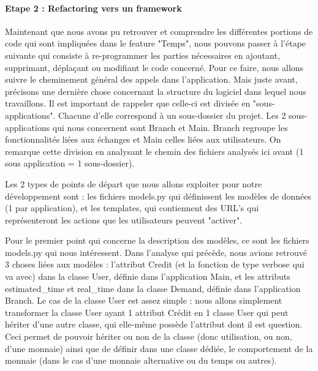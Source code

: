 \paragraph{Etape 2 : Refactoring vers un framework}

Maintenant que nous avons pu retrouver et comprendre les différentes portions de code qui sont impliquées dans le feature "Temps",  nous pouvons passer à l'étape suivante qui consiste à re-programmer les parties nécessaires en ajoutant,  supprimant,  déplaçant ou modifiant le code concerné.  Pour ce faire,  nous allons suivre le cheminement général des appels dans l'application.  Mais juste avant,  précisons une dernière chose concernant la structure du logiciel dans lequel nous travaillons.  Il est important de rappeler que celle-ci est divisée en "sous-applications".  Chacune d'elle correspond à un sous-dossier du projet.  Les 2 sous-applications qui nous concernent sont Branch et Main.  Branch regroupe les fonctionnalités liées aux échanges et Main celles liées aux utilisateurs.  On remarque cette division en analysant le chemin des fichiers analysés ici avant (1 sous application = 1 sous-dossier).  

Les 2 types de points de départ que nous allons exploiter pour notre développement sont : les fichiers models.py qui définissent les modèles de données (1 par application),  et les templates,  qui contiennent des URL's qui représenteront les actions que les utilisateurs peuvent "activer".  

Pour le premier point qui concerne la description des modèles,  ce sont les fichiers models.py qui nous intéressent.  Dans l'analyse qui précède,  nous avions retrouvé 3 choses liées aux modèles : l'attribut Credit (et la fonction de type verbose qui va avec) dans la classe User,  définie dans l'application Main,  et les attributs estimated\_time et real\_time dans la classe Demand,  définie dans l'application Branch.  Le cas de la classe User est assez simple : nous allons simplement transformer la classe User ayant 1 attribut Crédit en 1 classe User qui peut hériter d'une autre classe,  qui elle-même possède l'attribut dont il est question.  Ceci permet de pouvoir hériter ou non de la classe (donc utilisation,  ou non,  d'une monnaie) ainsi que de définir dans une classe dédiée,  le comportement de la monnaie (dans le cas d'une monnaie alternative ou du temps ou autres).  


